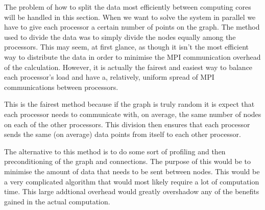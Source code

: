 \documentclass[pdftex,12pt,a4paper]{article}
\begin{document}
The problem of how to split the data most efficiently between computing cores will be handled in this section. When we want to solve the system in parallel we have to give each processor a certain number of points on the graph. The method used to divide the data was to simply divide the nodes equally among the processors. This may seem, at first glance, as though it isn't the most efficient way to distribute the data in order to minimise the MPI communication overhead of the calculation. However, it is actually the fairest and easiest way to balance each processor's load and have a, relatively, uniform spread of MPI communications between processors.

This is the fairest method because if the graph is truly random it is expect that each processor needs to communicate with, on average, the same number of nodes on each of the other processors. This division then ensures that each processor sends the same (on average) data points from itself to each other processor.

The alternative to this method is to do some sort of profiling and then preconditioning of the graph and connections. The purpose of this would be to minimise the amount of data that needs to be sent between nodes. This would be a very complicated algorithm that would most likely require a lot of computation time. This large addtional overhead would greatly overshadow any of the benefits gained in the actual computation.
\end{document}
